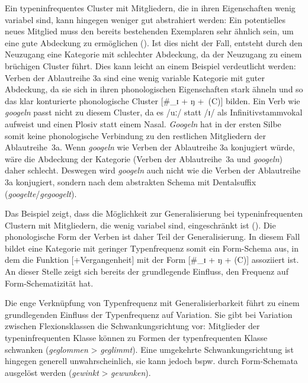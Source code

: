 Ein typeninfrequentes Cluster mit Mitgliedern, die in ihren Eigenschaften wenig variabel sind, kann hingegen weniger gut abstrahiert werden: Ein potentielles neues Mitglied muss den bereits bestehenden Exemplaren sehr ähnlich sein, um eine gute Abdeckung zu ermöglichen (\cite[62--65]{Goldberg.2019}). Ist dies nicht der Fall, entsteht durch den Neuzugang eine Kategorie mit schlechter Abdeckung, da der Neuzugang zu einem brüchigen Cluster führt. Dies kann leicht an einem Beispiel verdeutlicht werden: Verben der Ablautreihe 3a sind eine wenig variable Kategorie mit guter Abdeckung, da sie sich in ihren phonologischen Eigenschaften stark ähneln und so das klar konturierte phonologische Cluster [\#\_ɪ + ŋ +~(C)]  bilden. Ein Verb wie \textit{googeln} passt nicht zu diesem Cluster, da es /uː/ statt /ɪ/ als Infinitivstammvokal aufweist und einen Plosiv statt einem Nasal. \textit{Googeln} hat in der ersten Silbe somit keine phonologische Verbindung zu den restlichen Mitgliedern der Ablautreihe~3a. Wenn \textit{googeln} wie Verben der Ablautreihe 3a konjugiert würde, wäre die Abdeckung der Kategorie (Verben der Ablautreihe~3a und \textit{googeln}) daher schlecht. Deswegen wird \textit{googeln} auch nicht wie die Verben der Ablautreihe 3a konjugiert, sondern nach dem abstrakten Schema mit Dentalsuffix (\textit{googelte}/\textit{gegoogelt}).  

 
Das Beispiel zeigt, dass die Möglichkeit zur Generalisierung bei typeninfrequenten Clustern mit Mitgliedern, die wenig variabel sind, eingeschränkt ist (\cite[65]{Goldberg.2019}). Die phonologische Form der Verben ist daher Teil der Generalisierung. In diesem Fall bildet eine Kategorie mit geringer Typenfrequenz somit ein Form-Schema aus, in dem die Funktion [+Vergangenheit] mit der Form [\#\_ɪ + ŋ + (C)]  assoziiert ist. An dieser Stelle zeigt sich bereits der grundlegende Einfluss, den Frequenz auf Form-Schematizität hat.
   
Die enge Verknüpfung von Typenfrequenz mit Generalisierbarkeit führt zu einem grundlegenden Einfluss der Typenfrequenz auf Variation. Sie gibt bei Variation zwischen Flexionsklassen die Schwankungsrichtung vor: Mitglieder der typeninfrequenten Klasse können zu Formen der typenfrequenten Klasse schwanken (\textit{geglommen} > \textit{geglimmt}). Eine umgekehrte Schwankungsrichtung ist hingegen generell unwahrscheinlich, sie kann jedoch bspw. durch Form-Schemata ausgelöst werden (\textit{gewinkt} > \textit{gewunken}).


